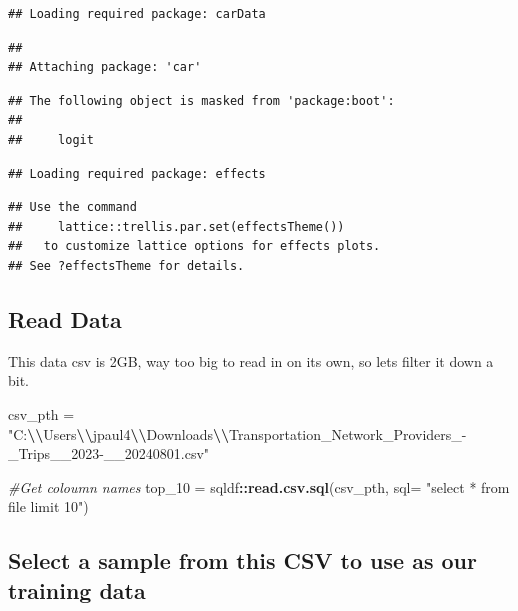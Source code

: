 \documentclass[
]{article}
\newenvironment{Shaded}{\begin{snugshade}}{\end{snugshade}}
\newcommand{\AttributeTok}[1]{\textcolor[rgb]{0.13,0.29,0.53}{#1}}
\newcommand{\CommentTok}[1]{\textcolor[rgb]{0.56,0.35,0.01}{\textit{#1}}}
\newcommand{\FunctionTok}[1]{\textcolor[rgb]{0.13,0.29,0.53}{\textbf{#1}}}
\newcommand{\NormalTok}[1]{#1}
\newcommand{\OtherTok}[1]{\textcolor[rgb]{0.56,0.35,0.01}{#1}}
\newcommand{\SpecialCharTok}[1]{\textcolor[rgb]{0.81,0.36,0.00}{\textbf{#1}}}
\newcommand{\StringTok}[1]{\textcolor[rgb]{0.31,0.60,0.02}{#1}}
\begin{document}
\begin{verbatim}
## Loading required package: carData
\end{verbatim}

\begin{verbatim}
## 
## Attaching package: 'car'
\end{verbatim}

\begin{verbatim}
## The following object is masked from 'package:boot':
## 
##     logit
\end{verbatim}

\begin{verbatim}
## Loading required package: effects
\end{verbatim}

\begin{verbatim}
## Use the command
##     lattice::trellis.par.set(effectsTheme())
##   to customize lattice options for effects plots.
## See ?effectsTheme for details.
\end{verbatim}

\subsection{Read Data}\label{read-data}

This data csv is 2GB, way too big to read in on its own, so lets filter
it down a bit.

\begin{Shaded}
\begin{Highlighting}[]
\NormalTok{csv\_pth }\OtherTok{=} \StringTok{"C:}\SpecialCharTok{\textbackslash{}\textbackslash{}}\StringTok{Users}\SpecialCharTok{\textbackslash{}\textbackslash{}}\StringTok{jpaul4}\SpecialCharTok{\textbackslash{}\textbackslash{}}\StringTok{Downloads}\SpecialCharTok{\textbackslash{}\textbackslash{}}\StringTok{Transportation\_Network\_Providers\_{-}\_Trips\_\_2023{-}\_\_20240801.csv"}

\CommentTok{\#Get coloumn names}
\NormalTok{top\_10 }\OtherTok{=}\NormalTok{ sqldf}\SpecialCharTok{::}\FunctionTok{read.csv.sql}\NormalTok{(csv\_pth, }\AttributeTok{sql=} \StringTok{"select * from file limit 10"}\NormalTok{)}
\end{Highlighting}
\end{Shaded}

\subsection{Select a sample from this CSV to use as our training
data}\label{select-a-sample-from-this-csv-to-use-as-our-training-data}
\end{document}
